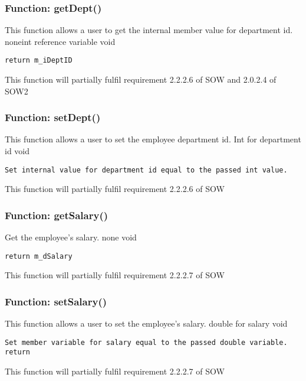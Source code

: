 \documentclass[12pt]{article}%
\newcounter{subsubsubsection}[subsubsection]
\begin{document}
\subsubsection{Function:  getDept()}
This function allows a user to get the internal member value for department id.
noneint reference variable
void
\begin{verbatim}
return m_iDeptID
\end{verbatim}
This function will partially fulfil requirement 2.2.2.6 of SOW and 2.0.2.4 of SOW2

\subsubsection{Function:  setDept()}
This function allows a user to set the employee department id.
Int for department id
void
\begin{verbatim}
Set internal value for department id equal to the passed int value.
\end{verbatim}
This function will partially fulfil requirement 2.2.2.6 of SOW

\subsubsection{Function:  getSalary()}
Get the employee's salary.
none
void
\begin{verbatim}
return m_dSalary
\end{verbatim}
This function will partially fulfil requirement 2.2.2.7 of SOW

\subsubsection{Function:  setSalary()}
This function allows a user to set the employee's salary.
double for salary
void
\begin{verbatim}
Set member variable for salary equal to the passed double variable.
return
\end{verbatim}
This function will partially fulfil requirement 2.2.2.7 of SOW
\end{document}
